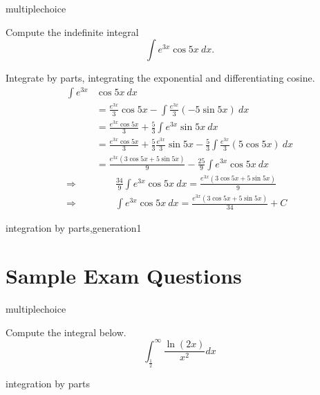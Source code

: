 \documentclass{ximera}
\begin{document}
\begin{question}
\begin{type}
multiplechoice
\end{type}
Compute the indefinite integral 
\[\int e^{3x}  \cos 5x ~ dx.\]
\begin{multiplechoice}
\end{multiplechoice}
\begin{feedback}
Integrate by parts, integrating the exponential and differentiating cosine.
\[ \begin{aligned}
    \int e^{3x} & \cos 5x ~ dx \\
    & = \frac{e^{3x}}{3} \cos 5x - \int \frac{e^{3x}}{3} (-5 \sin 5x) ~ dx \\
    & = \frac{e^{3x} \cos 5x}{3} + \frac{5}{3} \int e^{3x} \sin 5x ~ dx \\
    & = \frac{e^{3x} \cos 5x}{3} + \frac{5}{3} \frac{e^{3x}}{3} \sin 5x - \frac{5}{3} \int \frac{e^{3x}}{3} (5 \cos 5x) ~ dx \\
    & = \frac{e^{3x} (3 \cos 5x + 5 \sin 5x)}{9} - \frac{25}{9} \int e^{3x} \cos 5x ~ dx  \\
    \Rightarrow   & \qquad \frac{34}{9}  \int e^{3x}  \cos 5x ~ dx  = \frac{e^{3x} (3 \cos 5x + 5 \sin 5x)}{9} \\
    \Rightarrow & \qquad  \int  e^{3x}  \cos 5x ~ dx = \frac{e^{3x} (3 \cos 5x + 5 \sin 5x)}{34} + C
\end{aligned}\]
\end{feedback}
\begin{keywords}
integration by parts,generation1
\end{keywords}
\end{question}

\section*{Sample Exam Questions}

\begin{question}[2015C.11]
\begin{type}
multiplechoice
\end{type}
Compute the integral below.
\[ \int_{\frac{1}{2}}^\infty \frac{ \ln (2x)}{x^2} dx \]
\begin{multiplechoice}
\end{multiplechoice}
\begin{keywords}
integration by parts
\end{keywords}
\end{question}
\end{document}
